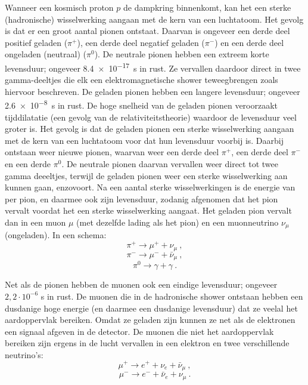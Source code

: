Wanneer een kosmisch proton $p$ de dampkring binnenkomt, kan het een
sterke (hadronische) wisselwerking aangaan met de kern van een
luchtatoom. Het gevolg is dat er een groot aantal pionen ontstaat.
Daarvan is ongeveer een derde deel positief geladen ($\pi^+$), een
derde deel negatief geladen ($\pi^-$) en  een derde deel ongeladen
(neutraal) ($\pi^0$). De neutrale pionen hebben een extreem korte
levensduur; ongeveer \SI{8,4e-17}{\second} in rust. Ze vervallen daardoor
direct in twee gamma-deeltjes die elk een elektromagnetische shower
teweegbrengen zoals hiervoor beschreven. De geladen pionen hebben een
langere levensduur; ongeveer \SI{2,6e-8}{\second} in rust. De hoge snelheid
van de geladen pionen veroorzaakt tijddilatatie (een gevolg van de
relativiteitstheorie) waardoor de levensduur veel groter is. Het gevolg
is dat de geladen pionen een sterke wisselwerking aangaan met de kern
van een luchtatoom voor dat hun levensduur voorbij is. Daarbij ontstaan
weer nieuwe pionen, waarvan weer een derde deel $\pi^+$, een derde
deel $\pi^-$ en een derde $\pi^0$. De neutrale pionen daarvan
vervallen weer direct tot twee gamma deeeltjes, terwijl de geladen
pionen weer een sterke wisselwerking aan kunnen gaan, enzovoort. Na een
aantal sterke wisselwerkingen is de energie van per pion, en daarmee ook
zijn levensduur, zodanig afgenomen dat het pion vervalt voordat het een
sterke wisselwerking aangaat. Het geladen pion vervalt dan in een muon
$\mu$ (met dezelfde lading als het pion) en een muonneutrino $\nu_\mu$
(ongeladen). In een schema:
\begin{equation}
    \pi^+ \rightarrow \mu^+ + \nu_\mu \ , \nonumber
\end{equation}
\begin{equation}
    \pi^- \rightarrow \mu^- + \bar{\nu}_\mu \ , \nonumber
\end{equation}
\begin{equation}  
    \pi^0 \rightarrow \gamma + \gamma \ . \nonumber
\end{equation}

Net als de pionen hebben de muonen ook een eindige levensduur; ongeveer
$2,2 \cdot 10^{-6}$ s in rust. De muonen die in de hadronische shower
ontstaan hebben een dusdanige hoge energie (en daarmee een dusdanige
levensduur) dat ze veelal het aardoppervlak bereiken. Omdat ze geladen
zijn kunnen ze net als de elektronen een signaal afgeven in de \hisparc
detector. De muonen die niet het aardoppervlak bereiken zijn ergens in
de lucht vervallen in een elektron en twee verschillende neutrino's:
\begin{equation}
    \mu^+ \rightarrow e^+ + \nu_e + \bar{\nu}_\mu \ , \nonumber
\end{equation}
\begin{equation}
    \mu^- \rightarrow e^- + \bar{\nu}_e + \nu_\mu \ . \nonumber
\end{equation}  

